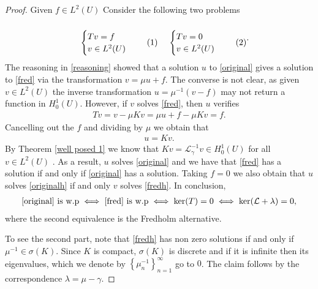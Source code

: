 \documentclass[
    a4paper,
    DIV=14,
    abstract=true,
    numbers=noenddot
]
{scrartcl}
\theoremstyle{definition}
\newcommand{\rm}[1]{\mathrm{#1}}
\newcommand{\Ll}{\mathcal{L}}
\begin{document}
\begin{proof}
	Given $f \in L^2(U)$  Consider the following two problems
	\begin{align}
		\begin{minipage}{0.3\linewidth}
			\begin{equation}
				\begin{cases}
					Tv = f \\
					v \in L^2(U)
				\end{cases}\label{fred}
			\end{equation}
		\end{minipage}%
		\begin{minipage}{0.3\linewidth}
			\begin{equation}
				\begin{cases}
					Tv = 0 \\
					v \in L^2(U)
				\end{cases}\label{fredh}
			\end{equation}
		\end{minipage}.
	\end{align}
	The reasoning in \eqref{reasoning} showed that a solution $u$ to \eqref{original} gives a solution to \eqref{fred} via the transformation $v=\mu u +f$. The converse is not clear, as given $v \in L^2(U)$  the inverse transformation $u = \mu ^{-1}(v-f)$ may not return a function in $H_0^1(U)$. However, if $v$  solves \eqref{fred}, then $u$ verifies
	\begin{align*}
		Tv=v-\mu K v=\mu u +f - \mu K v=f.
	\end{align*}
	Cancelling out the $f$ and dividing by $\mu$ we obtain that
	\begin{align*}
		u =Kv.
	\end{align*}
	By Theorem \ref{well posed 1} we know that $Kv = \Ll _\gamma ^{-1} v \in H_0^1(U)$ for all $v \in L^2(U)$ . As a result, $u$ solves \eqref{original} and   we have that \eqref{fred} has a solution if and only if \eqref{original} has a solution. Taking $f=0$ we also obtain that $u$ solves \eqref{originalh}  if and only  $v$  solves \eqref{fredh}. In conclusion,
	\begin{align*}
		\eqref{original} \text{ is } \rm{w.p} \iff \eqref{fred} \text{ is } \rm{w.p} \iff \ker(T) =0 \iff \ker(\Ll +\lambda )=0,
	\end{align*}
	where the second equivalence is the Fredholm alternative.

	To see the second part, note that \eqref{fredh} has non zero solutions if and only if $\mu ^{-1} \in \sigma (K)$. Since $K$ is compact, $\sigma(K)$ is discrete and if it is infinite then its eigenvalues, which we denote by $\left\{\mu _n^{-1}\right\}_{n=1}^\infty$ go to $0$. The claim follows by the correspondence $\lambda =\mu -\gamma$.


\end{proof}
\end{document}
